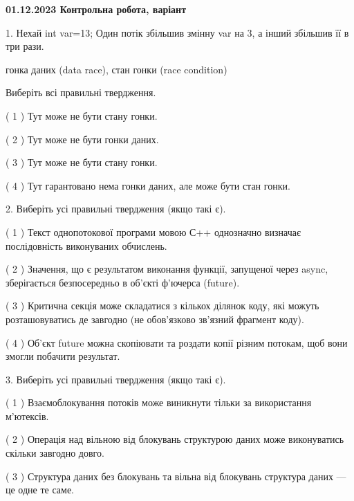 \documentclass[12pt, ukrainian]{article}
\begin{document}
\vspace{4mm}
\newpage
\begin {large}

\textbf{01.12.2023 Контрольна робота, варіант  }\par


{
1. Нехай int var=13; Один потік збільшив змінну var на 3, а інший збільшив її в три рази.

гонка даних (data race), стан гонки (race condition)

Виберіть всі правильні твердження.\par
\vspace{2mm}
( 1 ) Тут може не бути стану гонки.%

( 2 ) Тут може не бути гонки даних.%

( 3 ) Тут може не бути стану гонки.%

( 4 ) Тут гарантовано нема гонки даних, але може бути стан гонки.%


\vspace{5mm}
2. Виберіть усі правильні твердження (якщо такі є).\par
\vspace{2mm}

( 1 ) Текст однопотокової програми мовою С++ однозначно визначає послідовність виконуваних обчислень.%

( 2 ) Значення, що є результатом виконання функції, запущеної через async, зберігається безпосередньо в об’єкті ф’ючерса (future).%

( 3 ) Критична секція може складатися з кількох ділянок коду, які можуть розташовуватись де завгодно (не обов’язково зв’язний фрагмент коду).%

( 4 ) Об’єкт future можна скопіювати та роздати копії різним потокам, щоб вони змогли побачити результат.%


\vspace{5mm}
3. Виберіть усі правильні твердження (якщо такі є).\par
\vspace{2mm}

( 1 ) Взаємоблокування потоків може виникнути тільки за використання м’ютексів.%

( 2 ) Операція над вільною від блокувань структурою даних може виконуватись скільки завгодно довго.%

( 3 ) Структура даних без блокувань та вільна від блокувань структура даних --- це одне те саме.%

}
\end{large}
\end{document}
